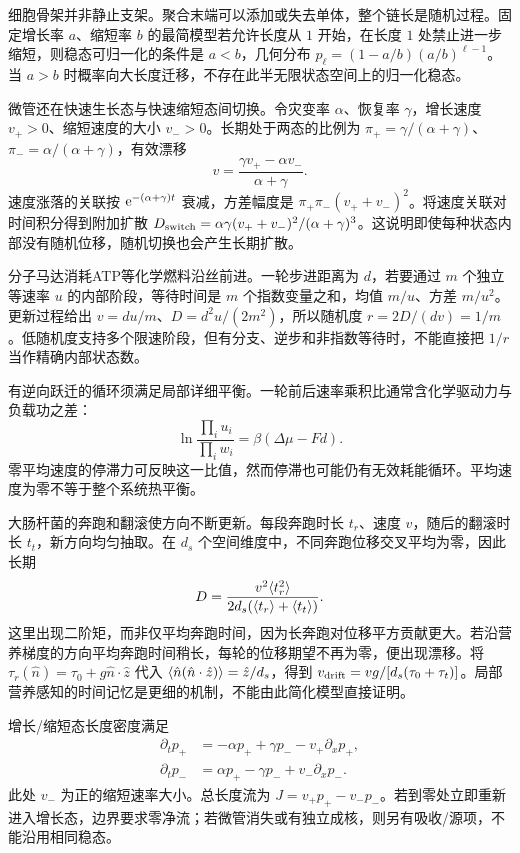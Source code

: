 细胞骨架并非静止支架。聚合末端可以添加或失去单体，整个链长是随机过程。固定增长率 $a$、缩短率 $b$ 的最简模型若允许长度从 $1$ 开始，在长度 $1$ 处禁止进一步缩短，则稳态可归一化的条件是 $a<b$，几何分布 $p_\ell=(1-a/b)(a/b)^{\ell-1}$。当 $a>b$ 时概率向大长度迁移，不存在此半无限状态空间上的归一化稳态。

微管还在快速生长态与快速缩短态间切换。令灾变率 $\alpha$、恢复率 $\gamma$，增长速度 $v_+>0$、缩短速度的大小 $v_->0$。长期处于两态的比例为 $\pi_+=\gamma/(\alpha+\gamma)$、$\pi_-=\alpha/(\alpha+\gamma)$，有效漂移
\[
v=\frac{\gamma v_+-\alpha v_-}{\alpha+\gamma}.
\]
速度涨落的关联按 $\mathrm e^{-(\alpha+\gamma)t}$ 衰减，方差幅度是 $\pi_+\pi_-(v_++v_-)^2$。将速度关联对时间积分得到附加扩散 $D_{\rm switch}=\alpha\gamma(v_++v_-)^2/(\alpha+\gamma)^3$。这说明即使每种状态内部没有随机位移，随机切换也会产生长期扩散。

分子马达消耗ATP等化学燃料沿丝前进。一轮步进距离为 $d$，若要通过 $m$ 个独立等速率 $u$ 的内部阶段，等待时间是 $m$ 个指数变量之和，均值 $m/u$、方差 $m/u^2$。更新过程给出 $v=du/m$、$D=d^2u/(2m^2)$，所以随机度 $r=2D/(dv)=1/m$。低随机度支持多个限速阶段，但有分支、逆步和非指数等待时，不能直接把 $1/r$ 当作精确内部状态数。

有逆向跃迁的循环须满足局部详细平衡。一轮前后速率乘积比通常含化学驱动力与负载功之差：\[\ln\frac{\prod_i u_i}{\prod_i w_i}=\beta(\Delta\mu-Fd).\]零平均速度的停滞力可反映这一比值，然而停滞也可能仍有无效耗能循环。平均速度为零不等于整个系统热平衡。

大肠杆菌的奔跑和翻滚使方向不断更新。每段奔跑时长 $t_r$、速度 $v$，随后的翻滚时长 $t_t$，新方向均匀抽取。在 $d_s$ 个空间维度中，不同奔跑位移交叉平均为零，因此长期
\[
D=\frac{v^2\langle t_r^2\rangle}{2d_s(\langle t_r\rangle+\langle t_t\rangle)}.
\]
这里出现二阶矩，而非仅平均奔跑时间，因为长奔跑对位移平方贡献更大。若沿营养梯度的方向平均奔跑时间稍长，每轮的位移期望不再为零，便出现漂移。将 $
\tau_r(\hat n)=\tau_0+g\hat n\cdot\hat z$ 代入 $\langle \hat n(\hat n\cdot\hat z)\rangle=\hat z/d_s$，得到 $v_{\rm drift}=vg/[d_s(\tau_0+\tau_t)]$。局部营养感知的时间记忆是更细的机制，不能由此简化模型直接证明。

增长/缩短态长度密度满足
\begin{align*}
\partial_tp_+&=-\alpha p_++\gamma p_- -v_+\partial_xp_+,\\
\partial_tp_-&=\alpha p_+-\gamma p_- +v_-\partial_xp_-.
\end{align*}
此处 $v_-$ 为正的缩短速率大小。总长度流为 $J=v_+p_+-v_-p_-$。若到零处立即重新进入增长态，边界要求零净流；若微管消失或有独立成核，则另有吸收/源项，不能沿用相同稳态。

